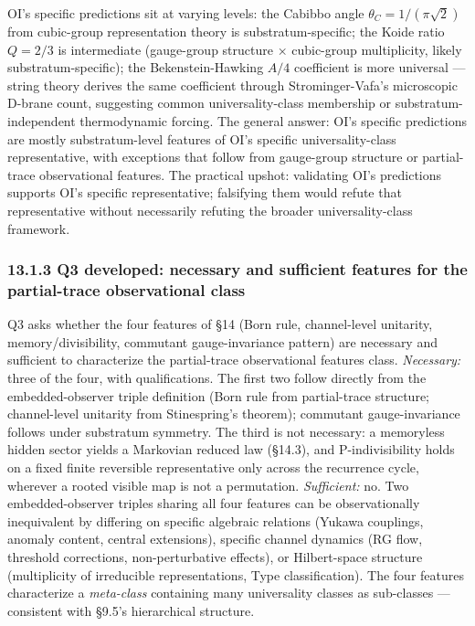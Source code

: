 \documentclass[
]{article}
\begin{document}
OI's specific predictions sit at varying levels: the Cabibbo angle
\(\theta_C = 1/(\pi\sqrt{2})\) from cubic-group representation theory is
substratum-specific; the Koide ratio \(Q = 2/3\) is intermediate
(gauge-group structure × cubic-group multiplicity, likely
substratum-specific); the Bekenstein-Hawking \(A/4\) coefficient is more
universal --- string theory derives the same coefficient through
Strominger-Vafa's microscopic D-brane count, suggesting common
universality-class membership or substratum-independent thermodynamic
forcing. The general answer: OI's specific predictions are mostly
substratum-level features of OI's specific universality-class
representative, with exceptions that follow from gauge-group structure
or partial-trace observational features. The practical upshot:
validating OI's predictions supports OI's specific representative;
falsifying them would refute that representative without necessarily
refuting the broader universality-class framework.

\hypertarget{q3-developed-necessary-and-sufficient-features-for-the-partial-trace-observational-class}{%
\subsubsection{13.1.3 Q3 developed: necessary and sufficient features
for the partial-trace observational
class}\label{q3-developed-necessary-and-sufficient-features-for-the-partial-trace-observational-class}}

Q3 asks whether the four features of §14 (Born rule, channel-level
unitarity, memory/divisibility, commutant gauge-invariance pattern) are
necessary and sufficient to characterize the partial-trace observational
features class. \emph{Necessary:} three of the four, with
qualifications. The first two follow directly from the embedded-observer
triple definition (Born rule from partial-trace structure; channel-level
unitarity from Stinespring's theorem); commutant gauge-invariance
follows under substratum symmetry. The third is not necessary: a
memoryless hidden sector yields a Markovian reduced law (§14.3), and
P-indivisibility holds on a fixed finite reversible representative only
across the recurrence cycle, wherever a rooted visible map is not a
permutation. \emph{Sufficient:} no. Two embedded-observer triples
sharing all four features can be observationally inequivalent by
differing on specific algebraic relations (Yukawa couplings, anomaly
content, central extensions), specific channel dynamics (RG flow,
threshold corrections, non-perturbative effects), or Hilbert-space
structure (multiplicity of irreducible representations, Type
classification). The four features characterize a \emph{meta-class}
containing many universality classes as sub-classes --- consistent with
§9.5's hierarchical structure.
\end{document}
